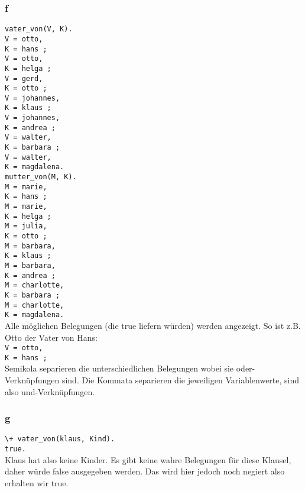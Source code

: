 \documentclass[11pt]{article}
\begin{document}
\subsubsection*{f}
\verb|vater_von(V, K).|\\
\verb|V = otto,|\\
\verb|K = hans ;|\\
\verb|V = otto,|\\
\verb|K = helga ;|\\
\verb|V = gerd,|\\
\verb|K = otto ;|\\
\verb|V = johannes,|\\
\verb|K = klaus ;|\\
\verb|V = johannes,|\\
\verb|K = andrea ;|\\
\verb|V = walter,|\\
\verb|K = barbara ;|\\
\verb|V = walter,|\\
\verb|K = magdalena.|\\

\verb|mutter_von(M, K).|\\
\verb|M = marie,|\\
\verb|K = hans ;|\\
\verb|M = marie,|\\
\verb|K = helga ;|\\
\verb|M = julia,|\\
\verb|K = otto ;|\\
\verb|M = barbara,|\\
\verb|K = klaus ;|\\
\verb|M = barbara,|\\
\verb|K = andrea ;|\\
\verb|M = charlotte,|\\
\verb|K = barbara ;|\\
\verb|M = charlotte,|\\
\verb|K = magdalena.|\\

Alle möglichen Belegungen (die true liefern würden) werden angezeigt.
So ist z.B. Otto der Vater von Hans:\\
\verb|V = otto,|\\
\verb|K = hans ;|\\
Semikola separieren die unterschiedlichen Belegungen wobei sie oder-Verknüpfungen sind.
Die Kommata separieren die jeweiligen Variablenwerte, sind also und-Verknüpfungen.

\subsubsection*{g}
\verb|\+ vater_von(klaus, Kind).|\\
\verb|true.|\\
Klaus hat also keine Kinder.
Es gibt keine wahre Belegungen für diese Klausel,
daher würde false ausgegeben werden.
Das wird hier jedoch noch negiert also erhalten wir true.
\end{document}

